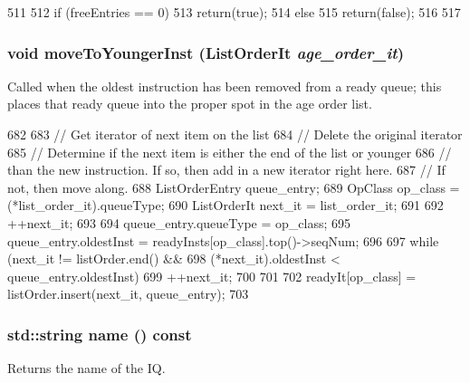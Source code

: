 \begin{DoxyCode}
511 {
512     if (freeEntries == 0) {
513         return(true);
514     } else {
515         return(false);
516     }
517 }
\end{DoxyCode}
\hypertarget{classInstructionQueue_ae4cc92176e08b27989bb2838e4e32b1c}{
\subsubsection[{moveToYoungerInst}]{\setlength{\rightskip}{0pt plus 5cm}void moveToYoungerInst ({\bf ListOrderIt} {\em age\_\-order\_\-it})}}
\label{classInstructionQueue_ae4cc92176e08b27989bb2838e4e32b1c}
Called when the oldest instruction has been removed from a ready queue; this places that ready queue into the proper spot in the age order list. 


\begin{DoxyCode}
682 {
683     // Get iterator of next item on the list
684     // Delete the original iterator
685     // Determine if the next item is either the end of the list or younger
686     // than the new instruction.  If so, then add in a new iterator right here.
687     // If not, then move along.
688     ListOrderEntry queue_entry;
689     OpClass op_class = (*list_order_it).queueType;
690     ListOrderIt next_it = list_order_it;
691 
692     ++next_it;
693 
694     queue_entry.queueType = op_class;
695     queue_entry.oldestInst = readyInsts[op_class].top()->seqNum;
696 
697     while (next_it != listOrder.end() &&
698            (*next_it).oldestInst < queue_entry.oldestInst) {
699         ++next_it;
700     }
701 
702     readyIt[op_class] = listOrder.insert(next_it, queue_entry);
703 }
\end{DoxyCode}
\hypertarget{classInstructionQueue_a37627d5d5bba7f4a8690c71c2ab3cb07}{
\subsubsection[{name}]{\setlength{\rightskip}{0pt plus 5cm}std::string name () const}}
\label{classInstructionQueue_a37627d5d5bba7f4a8690c71c2ab3cb07}
Returns the name of the IQ. 


